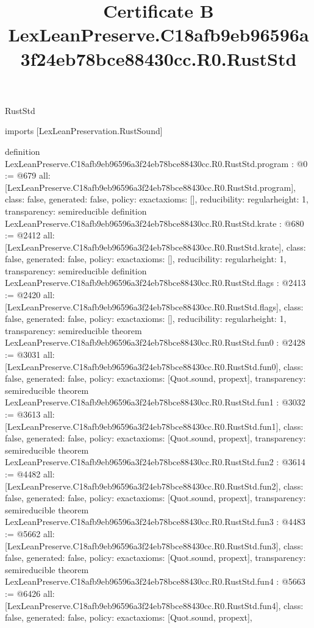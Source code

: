 \begin{lexlean}{RustStd}
\title{Certificate B LexLeanPreserve.C18afb9eb96596a3f24eb78bce88430cc.R0.RustStd}
\begin{coremodule}
imports [LexLeanPreservation.RustSound]

definition LexLeanPreserve.C18afb9eb96596a3f24eb78bce88430cc.R0.RustStd.program : @0 := @679 {
  all: [LexLeanPreserve.C18afb9eb96596a3f24eb78bce88430cc.R0.RustStd.program],
  class: false,
  generated: false,
  policy: exact{axioms: []},
  reducibility: regular{height: 1},
  transparency: semireducible
}
definition LexLeanPreserve.C18afb9eb96596a3f24eb78bce88430cc.R0.RustStd.krate : @680 := @2412 {
  all: [LexLeanPreserve.C18afb9eb96596a3f24eb78bce88430cc.R0.RustStd.krate],
  class: false,
  generated: false,
  policy: exact{axioms: []},
  reducibility: regular{height: 1},
  transparency: semireducible
}
definition LexLeanPreserve.C18afb9eb96596a3f24eb78bce88430cc.R0.RustStd.flags : @2413 := @2420 {
  all: [LexLeanPreserve.C18afb9eb96596a3f24eb78bce88430cc.R0.RustStd.flags],
  class: false,
  generated: false,
  policy: exact{axioms: []},
  reducibility: regular{height: 1},
  transparency: semireducible
}
theorem LexLeanPreserve.C18afb9eb96596a3f24eb78bce88430cc.R0.RustStd.fun0 : @2428 := @3031 {
  all: [LexLeanPreserve.C18afb9eb96596a3f24eb78bce88430cc.R0.RustStd.fun0],
  class: false,
  generated: false,
  policy: exact{axioms: [Quot.sound, propext]},
  transparency: semireducible
}
theorem LexLeanPreserve.C18afb9eb96596a3f24eb78bce88430cc.R0.RustStd.fun1 : @3032 := @3613 {
  all: [LexLeanPreserve.C18afb9eb96596a3f24eb78bce88430cc.R0.RustStd.fun1],
  class: false,
  generated: false,
  policy: exact{axioms: [Quot.sound, propext]},
  transparency: semireducible
}
theorem LexLeanPreserve.C18afb9eb96596a3f24eb78bce88430cc.R0.RustStd.fun2 : @3614 := @4482 {
  all: [LexLeanPreserve.C18afb9eb96596a3f24eb78bce88430cc.R0.RustStd.fun2],
  class: false,
  generated: false,
  policy: exact{axioms: [Quot.sound, propext]},
  transparency: semireducible
}
theorem LexLeanPreserve.C18afb9eb96596a3f24eb78bce88430cc.R0.RustStd.fun3 : @4483 := @5662 {
  all: [LexLeanPreserve.C18afb9eb96596a3f24eb78bce88430cc.R0.RustStd.fun3],
  class: false,
  generated: false,
  policy: exact{axioms: [Quot.sound, propext]},
  transparency: semireducible
}
theorem LexLeanPreserve.C18afb9eb96596a3f24eb78bce88430cc.R0.RustStd.fun4 : @5663 := @6426 {
  all: [LexLeanPreserve.C18afb9eb96596a3f24eb78bce88430cc.R0.RustStd.fun4],
  class: false,
  generated: false,
  policy: exact{axioms: [Quot.sound, propext]},
}
\end{coremodule}
\end{lexlean}
